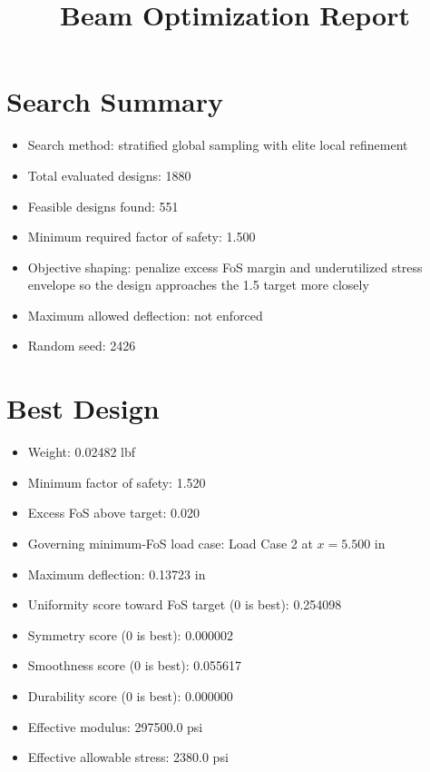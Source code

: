 \documentclass[11pt]{article}
\title{Beam Optimization Report}
\date{}
\begin{document}
\maketitle

\section*{Search Summary}
\begin{itemize}
\item Search method: stratified global sampling with elite local refinement
\item Total evaluated designs: 1880
\item Feasible designs found: 551
\item Minimum required factor of safety: 1.500
\item Objective shaping: penalize excess FoS margin and underutilized stress envelope so the design approaches the 1.5 target more closely
\item Maximum allowed deflection: not enforced
\item Random seed: 2426
\end{itemize}

\section*{Best Design}
\begin{itemize}
\item Weight: 0.02482 lbf
\item Minimum factor of safety: 1.520
\item Excess FoS above target: 0.020
\item Governing minimum-FoS load case: Load Case 2 at $x=5.500$ in
\item Maximum deflection: 0.13723 in
\item Uniformity score toward FoS target (0 is best): 0.254098
\item Symmetry score (0 is best): 0.000002
\item Smoothness score (0 is best): 0.055617
\item Durability score (0 is best): 0.000000
\item Effective modulus: 297500.0 psi
\item Effective allowable stress: 2380.0 psi
\end{itemize}
\end{document}
